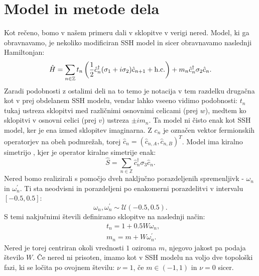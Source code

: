 \chapter{Model in metode dela}
Kot rečeno, bomo v našem primeru dali v sklopitve v verigi nered. Model, ki ga obravnavamo, je nekoliko modificiran SSH model in sicer obravnavamo naslednji Hamiltonjan:
\begin{equation}
\hat{H} = \sum_{n \in \mathbb{Z}} t_n \left( \frac{1}{2} \hat{c}_n^\dagger (\sigma_1 + i \sigma_2) \hat{c}_{n+1} + \textup{h.c.} \right) + m_n \hat{c}_n^\dagger \sigma_2 \hat{c}_n.
\end{equation}
Zaradi podobnosti z ostalimi deli na to temo \cite{mondragon} je notacija v tem razdelku drugačna kot v prej obdelanem SSH modelu, vendar lahko vseeno vidimo podobnosti: $t_n$ tukaj ustreza sklopitvi med različnimi osnovnimi celicami (prej $w$), medtem ko sklopitvi v osnovni celici (prej $v$) ustreza $\pm i m_n$. Ta model ni čisto enak kot SSH model, ker je ena izmed sklopitev imaginarna. Z $c_n$ je označen vektor fermionskih operatorjev na obeh podmrežah, torej
$\hat{c}_n = (\hat{c}_{n,A} , \hat{c}_{n,B})^T$.
Model ima kiralno simetrijo \cite{mondragon}, kjer je operator kiralne simetrije enak:
\begin{equation}
\hat{S} = \sum_{n  \in \mathbb{Z}} \hat{c}_n^\dagger \sigma_3 \hat{c}_n.
\end{equation}
Nered bomo realizirali s pomočjo dveh naključno porazdeljenih spremenljivk - $\omega_n$ in $\omega_n^\prime$. Ti sta neodvisni in porazdeljeni po enakomerni porazdelitvi v intervalu $[ -0.5 , 0.5]$:
\begin{equation}
\omega_n, \omega_n^\prime \sim \mathcal{U}(-0.5,0.5).
\end{equation}
S temi nakjučnimi števili definiramo sklopitve na naslednji način:
\begin{align}
&t_n = 1 + 0.5 W \omega_n, \\
&m_n = m + W \omega_n^\prime.
\end{align}
Nered je torej centriran okoli vrednosti $1$ oziroma $m$, njegovo jakost pa podaja število $W$.
Če nered ni prisoten, imamo kot v SSH modelu na voljo dve topološki fazi, ki se ločita po ovojnem številu: $\nu=1$, če $m \in (-1,1)$ in $\nu=0$ sicer.

